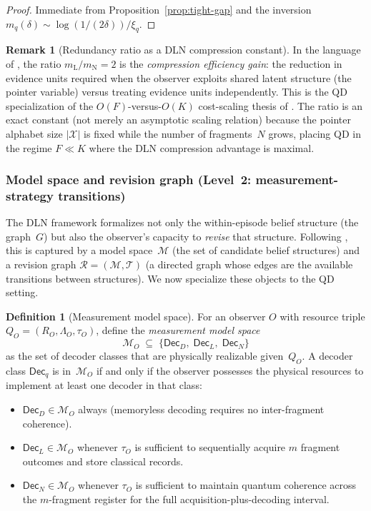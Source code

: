 \documentclass[11pt]{article}
\newcommand{\cX}{\mathcal{X}}
\newcommand{\1}{\mathbf{1}}
\theoremstyle{definition}
\newtheorem{definition}{Definition}
\newtheorem{remark}{Remark}
\theoremstyle{plain}
\begin{document}
\begin{proof}
Immediate from Proposition~\ref{prop:tight-gap} and the inversion
$m_q(\delta) \sim \log(1/(2\delta)) / \xi_q$.
\end{proof}


\begin{remark}[Redundancy ratio as a DLN compression constant]
\label{rem:compression}
In the language of \citep{WuDLNCompression2026preprint}, the ratio
$m_{\mathrm{L}}/m_{\mathrm{N}}=2$ is the \emph{compression efficiency
gain}: the reduction in evidence units required when the observer
exploits shared latent structure (the pointer variable) versus treating
evidence units independently.
This is the QD specialization of the $O(F)$-versus-$O(K)$ cost-scaling
thesis of \citep[Proposition~1(i)]{WuDLNCompression2026preprint}.
The ratio is an exact constant (not merely an asymptotic scaling
relation) because the pointer alphabet size $|\cX|$ is fixed while the
number of fragments~$N$ grows, placing QD in the regime $F\ll K$ where
the DLN compression advantage is maximal.
\end{remark}


\subsubsection{Model space and revision graph
              (Level~2: measurement-strategy transitions)}
\label{sec:revision-qd}

The DLN framework formalizes not only the within-episode belief structure
(the graph~$G$) but also the observer's capacity to \emph{revise} that
structure.
Following \citep[Sec.~2.3]{WuDLNCompression2026preprint}, this is
captured by a model space~$\mathcal{M}$ (the set of candidate belief
structures) and a revision graph $\mathcal{R}=(\mathcal{M},\mathcal{T})$
(a directed graph whose edges are the available transitions between
structures).
We now specialize these objects to the QD setting.

\begin{definition}[Measurement model space]
\label{def:model-space-qd}
For an observer $O$ with resource triple
$Q_O=(R_O,\Lambda_O,\tau_O)$, define the
\emph{measurement model space}
\[
  \mathcal{M}_O \;\subseteq\;
  \{\mathsf{Dec}_D,\;\mathsf{Dec}_L,\;\mathsf{Dec}_N\}
\]
as the set of decoder classes that are physically realizable
given~$Q_O$.
A decoder class $\mathsf{Dec}_q$ is in~$\mathcal{M}_O$ if and only if
the observer possesses the physical resources to implement at least one
decoder in that class:
\begin{itemize}
\item $\mathsf{Dec}_D\in\mathcal{M}_O$ always
  (memoryless decoding requires no inter-fragment coherence).
\item $\mathsf{Dec}_L\in\mathcal{M}_O$ whenever $\tau_O$ is sufficient
  to sequentially acquire $m$ fragment outcomes and store classical
  records.
\item $\mathsf{Dec}_N\in\mathcal{M}_O$ whenever $\tau_O$ is sufficient
  to maintain quantum coherence across the $m$-fragment register for
  the full acquisition-plus-decoding interval.
\end{itemize}
\end{definition}
\end{document}
